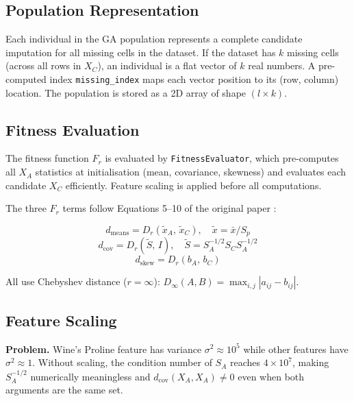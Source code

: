 \subsection{Population Representation}

Each individual in the GA population represents a complete candidate imputation for all missing cells in the dataset. If the dataset has $k$ missing cells (across all rows in $X_C$), an individual is a flat vector of $k$ real numbers. A pre-computed index \texttt{missing\_index} maps each vector position to its (row, column) location. The population is stored as a 2D array of shape $(l \times k)$.

\subsection{Fitness Evaluation}

The fitness function $F_r$ is evaluated by \texttt{FitnessEvaluator}, which pre-computes all $X_A$ statistics at initialisation (mean, covariance, skewness) and evaluates each candidate $X_C$ efficiently. Feature scaling is applied before all computations.

The three $F_r$ terms follow Equations 5--10 of the original paper \cite{FigueroaGarcia2023}:

\begin{equation}
    d_{\text{means}} = D_r\!\left(\tilde{x}_A,\, \tilde{x}_C\right), \quad \tilde{x} = \bar{x} / S_p
\end{equation}
\begin{equation}
    d_{\text{cov}} = D_r\!\left(\tilde{S},\, I\right), \quad \tilde{S} = S_A^{-1/2} S_C S_A^{-1/2}
\end{equation}
\begin{equation}
    d_{\text{skew}} = D_r\!\left(b_A,\, b_C\right)
\end{equation}

All use Chebyshev distance ($r = \infty$): $D_\infty(A, B) = \max_{i,j} |a_{ij} - b_{ij}|$.

\subsection{Feature Scaling}

\textbf{Problem.} Wine's Proline feature has variance $\sigma^2 \approx 10^5$ while other features have $\sigma^2 \approx 1$. Without scaling, the condition number of $S_A$ reaches $4 \times 10^7$, making $S_A^{-1/2}$ numerically meaningless and $d_{\text{cov}}(X_A, X_A) \neq 0$ even when both arguments are the same set.

